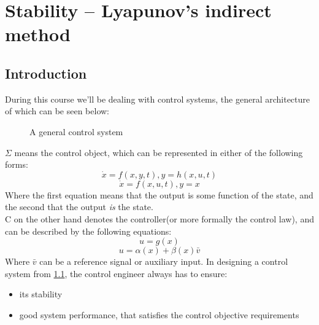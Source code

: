 
\chapter{Stability -- Lyapunov's indirect method}

\section{Introduction}

During this course we'll be dealing with control systems, the general architecture of which can be seen below:

\begin{figure}[h!]
\centering
{}
\caption{A general control system}
\label{csys}
\end{figure}
$\Sigma$ means the control object, which can be represented in either of the following forms:
\begin{equation} \label{obj:1}
 \dot{x}= f(x,y,t), y = h(x,u,t)
\end{equation}
\begin{equation} \label{obj:2}
    \dot{x} = f(x,u,t), y = x
\end{equation} 
Where the first equation means that the output is some function of the state, and the second that the output \textit{is} the state.\\
C on the other hand denotes the controller(or more formally the control law), and can be described by the following equations:
\begin{equation}
    \label{cont:1}  
    u = g(x)
\end{equation}
\begin{equation}
    \label{cont:2}
    u = \alpha(x) + \beta(x)\bar{v}
\end{equation}
Where $\bar{v}$ can be a reference signal or auxiliary input.
In designing a control system from  \ref{csys}, the control engineer always has to ensure:
\begin{itemize}
        \item its stability
        \item good system performance, that satisfies the control objective requirements
\end{itemize}

